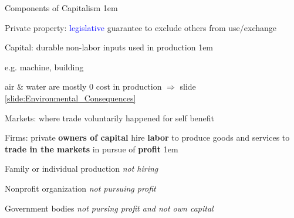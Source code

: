 \documentclass[11pt,aspectratio=43,usenames,dvipsnames]{beamer}
\newcommand{\blue}[1]{\textcolor{blue}{#1}}
\let\olditemize=\itemize
\let\endolditemize=\enditemize
\renewenvironment{itemize}{\olditemize \itemsep1em}{\endolditemize}
\let\oldenumerate=\enumerate
\let\endoldenumerate=\endenumerate
\renewenvironment{enumerate}{\oldenumerate \itemsep1em}{ \endoldenumerate}
\theoremstyle{definition}
\begin{document}
\begin{frame}{Components of Capitalism}
\label{slide:Components_of_Capitalism}
    \begin{enumerate}
        \item Private property: \blue{legislative} guarantee to exclude others from use/exchange
        \item Capital: durable non-labor inputs used in production
        \begin{itemize}
            \item e.g. machine, building
            \item air \& water are mostly $ 0 $ cost in production $ \Rightarrow  $ slide \ref{slide:Environmental_Consequences}
        \end{itemize}
        \item Markets: where trade voluntarily happened for self benefit
        \item Firms: private \textbf{owners of capital} hire \textbf{labor} to produce goods and services to \textbf{trade in the markets} in pursue of \textbf{profit}
        \begin{itemize}
            \item Family or individual production \textit{not hiring}
            \item Nonprofit organization \textit{not pursuing profit}
            \item Government bodies \textit{not pursing profit and not own capital}
        \end{itemize}

    \end{enumerate}


\end{frame}
\end{document}
